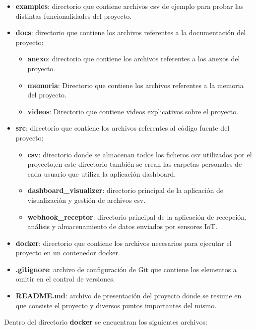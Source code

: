\begin{itemize}
    \item \textbf{examples}: directorio que contiene archivos csv de ejemplo para probar las distintas funcionalidades del proyecto.
   \item \textbf{docs}: directorio que contiene los archivos referentes a la documentación del proyecto:
   \begin{itemize}
       \item \textbf{anexo}: directorio que contiene los archivos referentes a los anexos del proyecto.
       \item \textbf{memoria}: Directorio que contiene los archivos referentes a la memoria del proyecto.
       \item \textbf{videos}: Directorio que contiene videos explicativos sobre el proyecto.
   \end{itemize}
    \item \textbf{src}: directorio que contiene los archivos referentes al código fuente del proyecto:
    \begin{itemize}
       \item \textbf{csv}: directorio donde se almacenan todos los ficheros csv utilizados por el proyecto,en este directorio también se crean las carpetas personales de cada usuario que utiliza la aplicación dashboard.
       \item \textbf{dashboard\_visualizer}: directorio principal de la aplicación de visualización y gestión de archivos csv.
       \item \textbf{webhook\_receptor}: directorio principal de la aplicación de recepción, análisis y almacenamiento de datos  enviados por sensores IoT.
   \end{itemize}
   
   \item \textbf{docker}: directorio que contiene los archivos necesarios para ejecutar el proyecto en un contenedor docker.

   \item \textbf{.gitignore}: archivo de configuración de Git que contiene los elementos a omitir en el control de versiones.

   \item \textbf{README.md}: archivo de presentación del proyecto donde se resume en que consiste el proyecto y diversos puntos importantes del mismo.
   
\end{itemize}

Dentro del directorio \textbf{docker} se encuentran los siguientes archivos:

